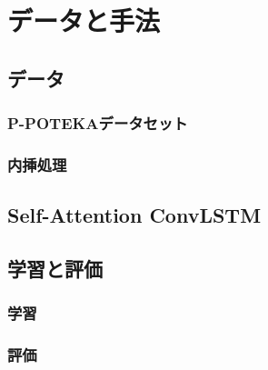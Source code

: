 \section{データと手法}

\subsection{データ}
\subsubsection{P-POTEKAデータセット}

\subsubsection{内挿処理}


\subsection{Self-Attention ConvLSTM}


\subsection{学習と評価}
\subsubsection{学習}

\subsubsection{評価}
